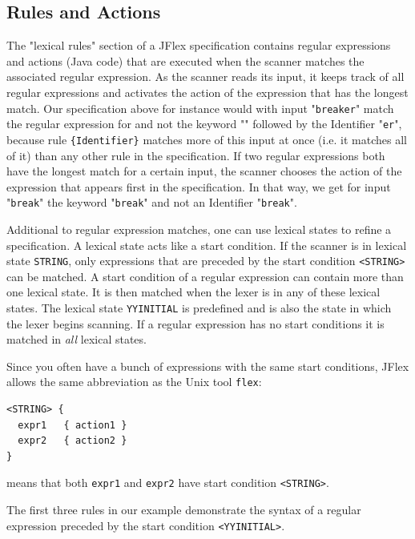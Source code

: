\documentclass[11pt]{scrartcl}
\newcommand{\trit}{\em}
\begin{document}
\subsection{Rules and Actions\label{ExampleLexRules}}
The "lexical rules" section of a JFlex specification contains regular expressions
and actions (Java code) that are executed when the scanner matches the
associated regular expression. As the scanner reads its input, it keeps
track of all regular expressions and activates the action of the expression
that has the longest match. Our specification above for instance would with input
"\texttt{breaker}" match the regular expression for \texttt{}
and not the keyword "\texttt{}"
followed by the Identifier "\texttt{er}", because rule \verb+{Identifier}+
matches more of this input at once (i.e. it matches all of it)
than any other rule in the specification. If two regular expressions both 
have the longest match for a certain input, the scanner chooses the action 
of the expression that appears first in the specification. In that way, we 
get for input "\texttt{break}" the keyword "\texttt{break}" and not an 
Identifier "\texttt{break}". 

Additional to regular expression matches, one can use lexical states to
refine a specification. A lexical state acts like a start condition.
If the scanner is in lexical state \texttt{STRING}, only expressions that
are preceded by the start condition \texttt{<STRING>} can be matched.
A start condition of a regular expression can contain more than one lexical
state. It is then matched when the lexer is in any of these lexical states.
The lexical state \texttt{YYINITIAL} is predefined and is also the state
in which the lexer begins scanning. If a regular expression has no start
conditions it is matched in {\trit all} lexical states.
\label{ExampleRulesStateBunch}

Since you often have a bunch of expressions with the same start conditions, 
JFlex allows the same abbreviation as the Unix tool \texttt{flex}:
\begin{verbatim}
<STRING> {
  expr1   { action1 }
  expr2   { action2 }
}
\end{verbatim}
means that both \texttt{expr1} and \texttt{expr2} have start condition \texttt{<STRING>}.
\label{ExampleRulesYYINITIAL}

The first three rules in our example demonstrate the syntax of a regular 
expression preceded by the start condition \texttt{<YYINITIAL>}.
\end{document}
